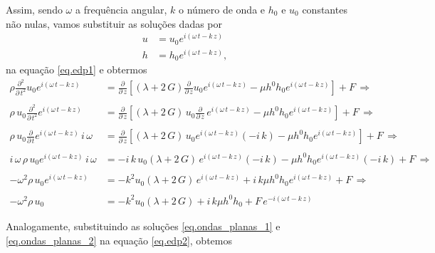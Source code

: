 Assim, sendo $\omega$ a frequ\^encia angular, $k$ o n\'umero de onda e $h_0$ e $u_0$ constantes n\~ao nulas, vamos substituir as solu\c{c}\~oes dadas por 
\begin{align}\label{eq.ondas_planas_1}
u&=u_0e^{i(\omega\,t-k\,z)}\\\label{eq.ondas_planas_2}
h&=h_0e^{i(\omega\,t-k\,z)},
\end{align}
na equa\c{c}\~ao \ref{eq.edp1} e obtermos
\begin{align}\nonumber
\rho\frac{\partial^2}{\partial\,t^2}u_0e^{i(\omega\,t-k\,z)}&=\frac{\partial}{\partial\,z}\left[(\lambda+2\,G)\frac{\partial}{\partial\,z}u_0e^{i(\omega\,t-k\,z)}-\mu h^0h_0e^{i(\omega\,t-k\,z)}\right]+F\,\Rightarrow\\\nonumber\\\nonumber
\rho\,u_0\frac{\partial^2}{\partial\,t^2}e^{i(\omega\,t-k\,z)}&=\frac{\partial}{\partial\,z}\left[(\lambda+2\,G)\,u_0\frac{\partial}{\partial\,z}\,e^{i(\omega\,t-k\,z)}-\mu h^0h_0e^{i(\omega\,t-k\,z)}\right]+F\,\Rightarrow\\\nonumber\\\nonumber
\rho\,u_0\frac{\partial}{\partial\,t}e^{i(\omega\,t-k\,z)}\,i\,\omega&=\frac{\partial}{\partial\,z}\left[(\lambda+2\,G)\,u_0e^{i(\omega\,t-k\,z)}(-i\,k)-\mu h^0h_0e^{i(\omega\,t-k\,z)}\right]+F\,\Rightarrow\\\nonumber\\\nonumber
i\,\omega\,\rho\,u_0e^{i(\omega\,t-k\,z)}\,i\,\omega&=-i\,k\,u_0(\lambda+2\,G)\,e^{i(\omega\,t-k\,z)}(-i\,k)-\mu h^0h_0e^{i(\omega\,t-k\,z)}(-i\,k)+F\,\Rightarrow\\\nonumber\\\nonumber
-\omega^2\rho\,u_0e^{i(\omega\,t-k\,z)}&=-k^2u_0(\lambda+2\,G)\,e^{i(\omega\,t-k\,z)}+i\,k\mu h^0h_0e^{i(\omega\,t-k\,z)}+F\,\Rightarrow\\\nonumber\\\label{eq.dedu_1}
-\omega^2\rho\,u_0&=-k^2u_0(\lambda+2\,G)+i\,k\mu h^0h_0+F\,e^{-i(\omega\,t-k\,z)}
\end{align}

Analogamente, substituindo as solu\c{c}\~oes \ref{eq.ondas_planas_1} e \ref{eq.ondas_planas_2} na equa\c{c}\~ao \ref{eq.edp2}, obtemos

